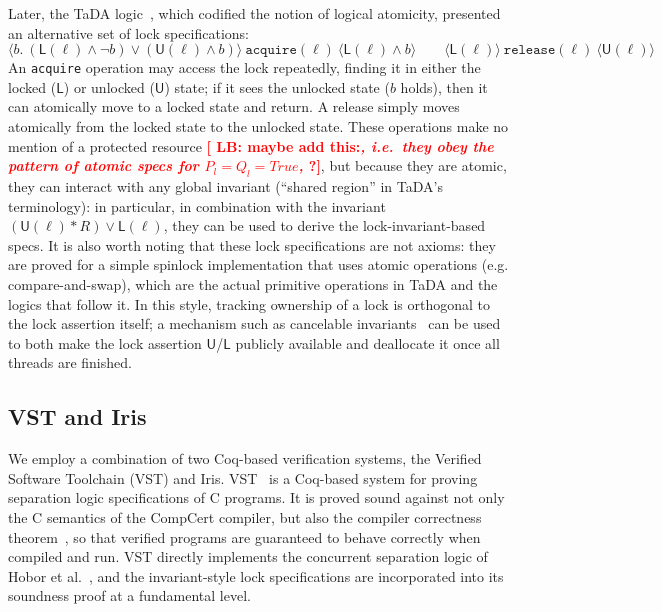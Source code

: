 \documentclass[runningheads]{llncs}
\newcommand{\LB}[1]{\textbf{\textcolor{red}{[ LB: #1]}}}
\begin{document}
Later, the TaDA logic~\cite{tada}, which codified the notion of logical atomicity, presented an alternative set of lock specifications:
\[\langle b.\ (\mathsf{L}(\ell) \land \neg b) \vee (\mathsf{U}(\ell) \land b) \rangle\ \texttt{acquire}(\ell)\ \langle \mathsf{L}(\ell) \land b \rangle \qquad \langle \mathsf{L}(\ell) \rangle\ \texttt{release}(\ell)\ \langle \mathsf{U}(\ell) \rangle\]
An \texttt{acquire} operation may access the lock repeatedly, finding it in either the locked ($\mathsf{L}$) or unlocked ($\mathsf{U}$) state; if it sees the unlocked state ($b$ holds), then it can atomically move to a locked state and return. A release simply moves atomically from the locked state to the unlocked state. These operations make no mention of a protected resource \LB{maybe add this:\emph{, i.e.~they obey the pattern of atomic specs for $P_l = Q_l = True$,} ?}, but because they are atomic, they can interact with any global invariant (``shared region'' in TaDA's terminology): in particular, in combination with the invariant $(\mathsf{U}(\ell) * R) \vee \mathsf{L}(\ell)$, they can be used to derive the lock-invariant-based specs. It is also worth noting that these lock specifications are not axioms: they are proved for a simple spinlock implementation that uses atomic operations (e.g. compare-and-swap), which are the actual primitive operations in TaDA and the logics that follow it. In this style, tracking ownership of a lock is orthogonal to the lock assertion itself; a mechanism such as cancelable invariants~\cite{rustbelt-relaxed} can be used to both make the lock assertion $\mathsf{U}$/$\mathsf{L}$ publicly available and deallocate it once all threads are finished.

\subsection{VST and Iris}

We employ a combination of two Coq-based verification systems, the Verified Software Toolchain (VST) and Iris. VST~\cite{plfcc} is a Coq-based system for proving separation logic specifications of C programs. It is proved sound against not only the C semantics of the CompCert compiler, but also the compiler correctness theorem~\cite{cpm}, so that verified programs are guaranteed to behave correctly when compiled and run. VST directly implements the concurrent separation logic of Hobor et al.~\cite{oraclesematic}, and the invariant-style lock specifications are incorporated into its soundness proof at a fundamental level.
\end{document}

